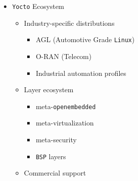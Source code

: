 \documentclass[
]{article}
\providecommand{\tightlist}{%
  \setlength{\itemsep}{0pt}\setlength{\parskip}{0pt}}
\begin{document}
\begin{itemize}
\begin{itemize}
    \begin{itemize}
    \tightlist
    \item
      Remote debugging

      \begin{itemize}
      \tightlist
      \item
        \texttt{GDB} server configuration
      \item
        Symbol management
      \item
        Core dump collection
      \end{itemize}
    \item
      System monitoring

      \begin{itemize}
      \tightlist
      \item
        Resource usage tracking
      \item
        Log aggregation
      \item
        Metrics collection
      \end{itemize}
    \item
      Performance analysis

      \begin{itemize}
      \tightlist
      \item
        Profiling tools integration
      \item
        Bottleneck identification
      \item
        Optimization strategies
      \end{itemize}
    \end{itemize}
  \item
    \texttt{Yocto} Ecosystem

    \begin{itemize}
    \tightlist
    \item
      Industry-specific distributions

      \begin{itemize}
      \tightlist
      \item
        AGL (Automotive Grade \texttt{Linux})
      \item
        O-RAN (Telecom)
      \item
        Industrial automation profiles
      \end{itemize}
    \item
      Layer ecosystem

      \begin{itemize}
      \tightlist
      \item
        meta-\texttt{openembedded}
      \item
        meta-virtualization
      \item
        meta-security
      \item
        \texttt{BSP} layers
      \end{itemize}
    \item
      Commercial support


\end{itemize}
\end{itemize}
\end{itemize}
\end{document}
